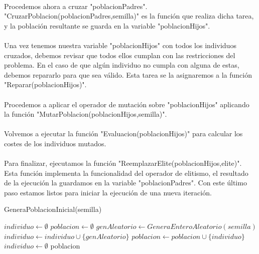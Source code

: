 	\paragraph{}Procedemos ahora a cruzar "poblacionPadres". "CruzarPoblacion(poblacionPadres,semilla)" es la función que realiza dicha tarea, y la población resultante se guarda en la variable "poblacionHijos".
	
	\paragraph{}Una vez tenemos nuestra variable "poblacionHijos" con todos los individuos cruzados, debemos revisar que todos ellos cumplan con las restricciones del problema. En el caso de que algún individuo no cumpla con alguna de estas, debemos repararlo para que sea válido. Esta tarea se la asignaremos a la función "Reparar(poblacionHijos)".
	
	\paragraph{}Procedemos a aplicar el operador de mutación sobre "poblacionHijos" aplicando la función "MutarPoblacion(poblacionHijos,semilla)".
	
	\paragraph{}Volvemos a ejecutar la función "Evaluacion(poblacionHijos)" para calcular los costes de los individuos mutados.
	
	\paragraph{}Para finalizar, ejecutamos la función "ReemplazarElite(poblacionHijos,elite)". Esta función implementa la funcionalidad del operador de elitismo, el resultado de la ejecución la guardamos en la variable "poblacionPadres". Con este último paso estamos listos para iniciar la ejecución de una nueva iteración.
		
	\begin{algorithm}[H]
		\caption{GeneraPoblacionInicial(semilla)}
		\begin{algorithmic}
			\STATE $individuo \leftarrow \emptyset$
			\STATE $poblacion \leftarrow \emptyset$
					\STATE $genAleatorio \leftarrow GeneraEnteroAleatorio(semilla)$
						\STATE $individuo \leftarrow individuo\cup\{genAleatorio\}$
					\ENDIF
				\ENDWHILE
				\STATE $poblacion \leftarrow poblacion\cup\{individuo\}$
				\STATE $individuo \leftarrow \emptyset$
				\ENDWHILE
			\RETURN poblacion
		\end{algorithmic}
	\end{algorithm}

